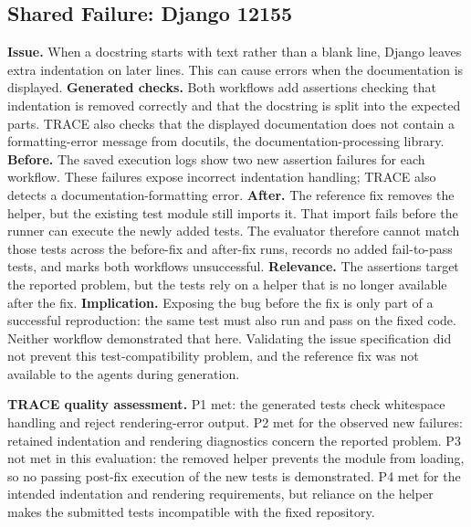 \subsection{Shared Failure: Django 12155}
\textbf{Issue.} When a docstring starts with text rather than a blank line, Django leaves extra indentation on later lines. This can cause errors when the documentation is displayed. \textbf{Generated checks.} Both workflows add assertions checking that indentation is removed correctly and that the docstring is split into the expected parts. TRACE also checks that the displayed documentation does not contain a formatting-error message from docutils, the documentation-processing library. \textbf{Before.} The saved execution logs show two new assertion failures for each workflow. These failures expose incorrect indentation handling; TRACE also detects a documentation-formatting error. \textbf{After.} The reference fix removes the  helper, but the existing test module still imports it. That import fails before the runner can execute the newly added tests. The evaluator therefore cannot match those tests across the before-fix and after-fix runs, records no added fail-to-pass tests, and marks both workflows unsuccessful. \textbf{Relevance.} The assertions target the reported problem, but the tests rely on a helper that is no longer available after the fix. \textbf{Implication.} Exposing the bug before the fix is only part of a successful reproduction: the same test must also run and pass on the fixed code. Neither workflow demonstrated that here. Validating the issue specification did not prevent this test-compatibility problem, and the reference fix was not available to the agents during generation.

\textbf{TRACE quality assessment.} P1 met: the generated tests check whitespace handling and reject rendering-error output. P2 met for the observed new failures: retained indentation and rendering diagnostics concern the reported problem. P3 not met in this evaluation: the removed helper prevents the module from loading, so no passing post-fix execution of the new tests is demonstrated. P4 met for the intended indentation and rendering requirements, but reliance on the helper makes the submitted tests incompatible with the fixed repository.

